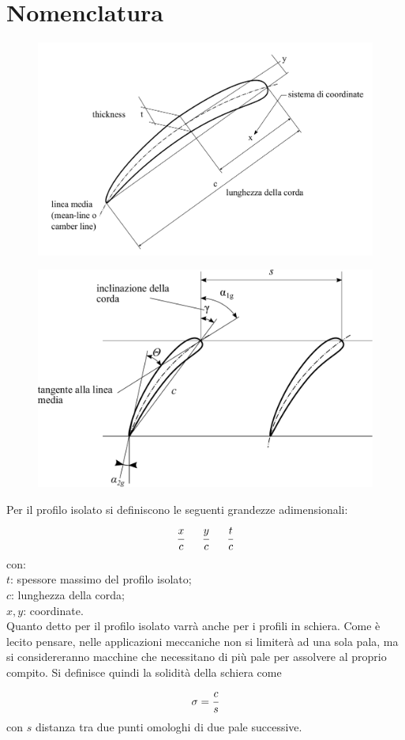 \section{Nomenclatura}
\begin{figure}[h!]
\centering
\begin{minipage}{.5\textwidth}
  \centering
  \includegraphics[width=.98\linewidth]{fig/profiloDef.pdf}
  \label{}
\end{minipage}%
\begin{minipage}{.5\textwidth}
  \centering
  \includegraphics[width=.98\linewidth]{fig/schiera_2.pdf}
  \label{}
\end{minipage}
\end{figure}
Per il profilo isolato si definiscono le seguenti grandezze adimensionali:
\begin{align*}
\cfrac{x}{c} \;\;\;\;\;\; \cfrac{y}{c} \;\;\;\;\;\; \cfrac{t}{c}
\end{align*}
con:\\[1mm]
$t$: spessore massimo del profilo isolato;\\
$c$: lunghezza della corda;\\
$x,y$: coordinate.\\[2mm]
Quanto detto per il profilo isolato varrà anche per i profili in schiera. Come è lecito pensare, nelle applicazioni meccaniche non si limiterà ad una sola pala, ma si considereranno macchine che necessitano di più pale per assolvere al proprio compito. Si definisce quindi la solidità della schiera come
\begin{equation}
\sigma = \cfrac{c}{s}
\end{equation}
con $s$ distanza tra due punti omologhi di due pale successive.
